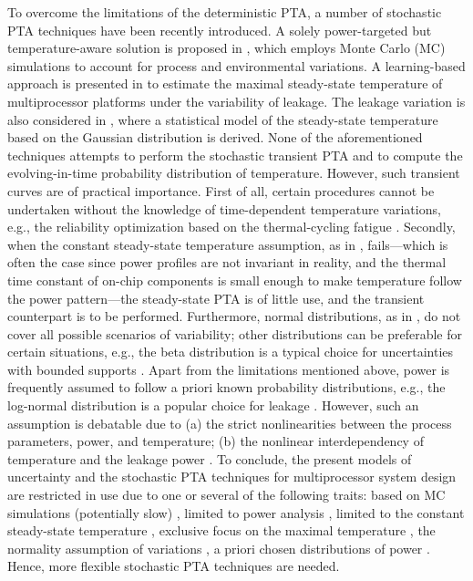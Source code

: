 To overcome the limitations of the deterministic PTA, a number of stochastic PTA techniques have been recently introduced. A solely power-targeted but temperature-aware solution is proposed in \cite{chandra2010}, which employs Monte Carlo (MC) simulations to account for process and environmental variations. A learning-based approach is presented in \cite{juan2011} to estimate the maximal steady-state temperature of multiprocessor platforms under the variability of leakage. The leakage variation is also considered in \cite{juan2012}, where a statistical model of the steady-state temperature based on the Gaussian distribution is derived. None of the aforementioned techniques attempts to perform the stochastic transient PTA and to compute the evolving-in-time probability distribution of temperature. However, such transient curves are of practical importance. First of all, certain procedures cannot be undertaken without the knowledge of time-dependent temperature variations, e.g., the reliability optimization based on the thermal-cycling fatigue \cite{ukhov2012}. Secondly, when the constant steady-state temperature assumption, as in \cite{juan2011, juan2012}, fails---which is often the case since power profiles are not invariant in reality, and the thermal time constant of on-chip components is small enough to make temperature follow the power pattern---the steady-state PTA is of little use, and the transient counterpart is to be performed. Furthermore, normal distributions, as in \cite{juan2012}, do not cover all possible scenarios of variability; other distributions can be preferable for certain situations, e.g., the beta distribution is a typical choice for uncertainties with bounded supports \cite{maitre2010}. Apart from the limitations mentioned above, power is frequently assumed to follow a priori known probability distributions, e.g., the log-normal distribution is a popular choice for leakage \cite{srivastava2010}. However, such an assumption is debatable due to (a) the strict nonlinearities between the process parameters, power, and temperature; (b) the nonlinear interdependency of temperature and the leakage power \cite{liu2007}. To conclude, the present models of uncertainty and the stochastic PTA techniques for multiprocessor system design are restricted in use due to one or several of the following traits: based on MC simulations (potentially slow) \cite{chandra2010}, limited to power analysis \cite{chandra2010}, limited to the constant steady-state temperature \cite{juan2011, juan2012}, exclusive focus on the maximal temperature \cite{juan2011}, the normality assumption of variations \cite{juan2012}, a priori chosen distributions of power \cite{srivastava2010}. Hence, more flexible stochastic PTA techniques are needed.

